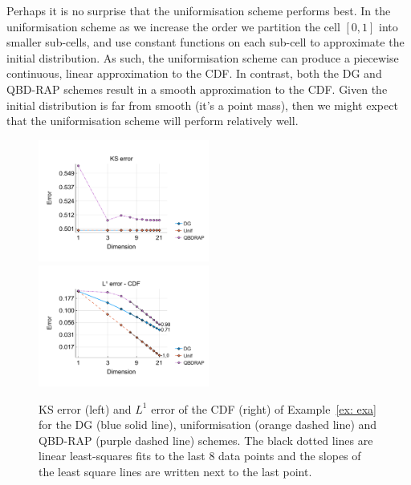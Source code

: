 \begin{example}
Perhaps it is no surprise that the uniformisation scheme performs best. In the uniformisation scheme as we increase the order we partition the cell \([0,1]\) into smaller sub-cells, and use constant functions on each sub-cell to approximate the initial distribution. As such, the uniformisation scheme can produce a piecewise continuous, linear approximation to the CDF. In contrast, both the DG and QBD-RAP schemes result in a smooth approximation to the CDF. Given the initial distribution is far from smooth (it's a point mass), then we might expect that the uniformisation scheme will perform relatively well. 
\begin{figure}[h]
	\centering
	\includegraphics[width=0.5\textwidth,trim={0.5cm 0.8cm 0.2cm 1.25cm},clip]{chapter6/figs/comp/fun1/meshs_ks_error_formatted.pdf}%
	\includegraphics[width=0.5\textwidth,trim={0.5cm 0.8cm 0.2cm 1.25cm},clip]{chapter6/figs/comp/fun1/meshs_l1_cdf_error_formatted.pdf}
	\caption{KS error (left) and \(L^1\) error of the CDF (right) of Example~\ref{ex: exa} for the DG (blue solid line), uniformisation (orange dashed line) and QBD-RAP (purple dashed line) schemes. The black dotted lines are linear least-squares fits to the last 8 data points and the slopes of the least square lines are written next to the last point.}
	\label{fig: fun 1 comp} 
\end{figure}


\end{example}
